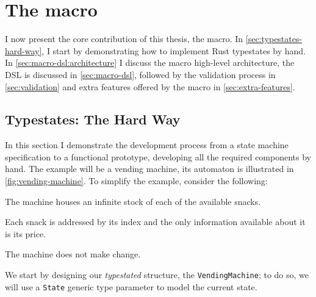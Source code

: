 

\chapter{The  macro}\label{cha:macro}

I now present the core contribution of this thesis, the  macro.
In \autoref{sec:typestates-hard-way}, I start by demonstrating how to implement Rust typestates by hand.
In \autoref{sec:macro-dsl:architecture} I discuss the macro high-level architecture,
the DSL is discussed in \autoref{sec:macro-dsl},
followed by the validation process in \autoref{sec:validation} and
extra features offered by the macro in \autoref{sec:extra-features}.

\section{Typestates: The Hard Way}\label{sec:typestates-hard-way}

In this section I demonstrate the development process from a state machine specification to a functional prototype,
developing all the required components by hand.
The example will be a vending machine, its automaton is illustrated in \autoref{fig:vending-machine}.
To simplify the example, consider the following:
\begin{compactitem}
    \item The machine houses an infinite stock of each of the available snacks.
    \item Each snack is addressed by its index and the only information available about it is its price.
    \item The machine does not make change.
\end{compactitem}




We start by designing our \emph{typestated} structure, the \texttt{VendingMachine};
to do so, we will use a \texttt{State} generic type parameter to model the current state.

